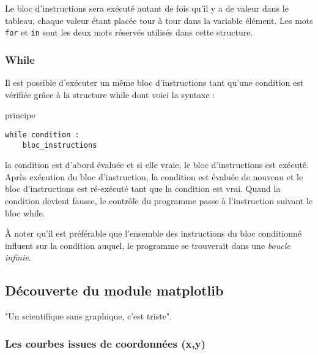 Le bloc d'instructions sera exécuté autant de fois qu'il y a de
valeur dans le tableau, chaque valeur étant placée tour à tour dans la
variable élément.
Les mots \texttt{for} et \texttt{in} sont les deux mots réservés utilisés dans cette structure.







\subsubsection{While}

Il est possible d’exécuter un même bloc d’instructions tant qu’une condition est
vérifiée grâce à la structure while dont voici la syntaxe :
\vskip 2pt
\begin{center}
  \begin{myterminalbox}[colback=gray!10]{principe}
\begin{verbatim}
while condition :
    bloc_instructions
\end{verbatim}
  \end{myterminalbox}
\end{center}

la condition est d’abord évaluée et si elle vraie, le bloc
d’instructions est exécuté.
Après exécution du bloc d’instruction, la
condition est évaluée de nouveau et le bloc d’instructions est ré-exécuté tant que la
condition est vrai. Quand la condition devient fausse, le contrôle du programme passe
à l’instruction suivant le bloc while.

À noter qu'il est préférable que l'ensemble des instructions du bloc conditionné influent
sur la condition auquel, le programme se trouverait dans une \textit{boucle infinie}.



\subsection{Découverte du module matplotlib}


"Un scientifique sans graphique, c'est triste".


\subsubsection{Les courbes issues de coordonnées (x,y)}



